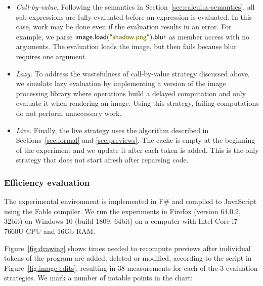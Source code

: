 \documentclass[english,submission]{programming}
\theoremstyle{plain}
\theoremstyle{definition}
\newcommand{\str}[1]{\textnormal{\textcolor{strclr}{\sffamily "#1"}}}
\newcommand{\ident}[1]{\textnormal{\textcolor{idclr}{\sffamily #1}}}
\begin{document}
\begin{itemize}
\item \emph{Call-by-value.} Following the semantics in Section~\ref{sec:calculus-semantics},
  all sub-expressions are fully evaluated before an expression is evaluated. In this case, work may
  be done even if the evaluation results in an error. For example, we parse
  $\ident{image}.\ident{load}(\str{shadow.png}).\ident{blur}$ as member access with no arguments.
  The evaluation loads the image, but then fails because blur requires one argument.

\item \emph{Lazy.} To address the wastefulness of call-by-value strategy discussed above, we
  simulate lazy evaluation by implementing a version of the image processing library where
  operations build a delayed computation and only evaluate it when rendering an image. Using
  this strategy, failing computations do not perform unnecessary work.

\item \emph{Live.} Finally, the live strategy uses the algorithm described in
  Sections~\ref{sec:formal} and \ref{sec:previews}. The cache is empty at the beginning of the
  experiment and we update it after each token is added. This is the only strategy that does
  not start afresh after reparsing code.
\end{itemize}

\subsubsection{Efficiency evaluation}
The experimental environment is implemented in F\# and compiled to JavaScript using the Fable
compiler. We run the experiments in Firefox (version 64.0.2, 32bit) on Windows 10
(build 1809, 64bit) on a computer with Intel Core i7-7660U CPU and 16Gb RAM.

Figure~\ref{fig:drawing} shows times needed to recompute previews after individual tokens
of the program are added, deleted or modified, according to the script in
Figure~\ref{fig:image-edits}, resulting in 38 measurements for each of the 3
evaluation strategies. We mark a number of notable points in the chart:
\end{document}
